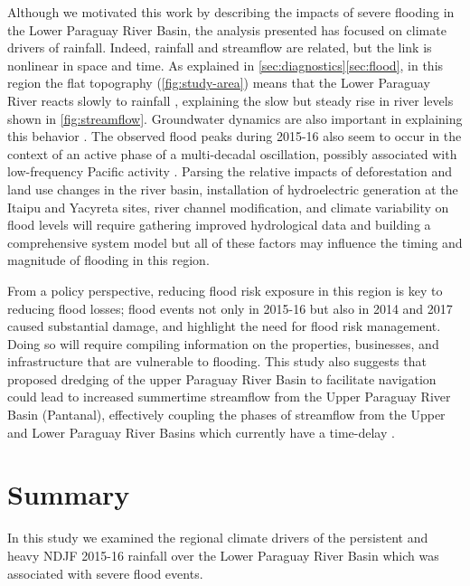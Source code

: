 \documentclass{ametsoc}
\begin{document}
Although we motivated this work by describing the impacts of severe flooding in the Lower Paraguay River Basin, the analysis presented has focused on climate drivers of rainfall.
Indeed, rainfall and streamflow are related, but the link is nonlinear in space and time.
As explained in \cref{sec:diagnostics}\ref{sec:flood}, in this region the flat topography (\cref{fig:study-area}) means that the Lower Paraguay River reacts slowly to rainfall \citep{Bravo:2011et,Barros:2004bn}, explaining the slow but steady rise in river levels shown in \cref{fig:streamflow}.
Groundwater dynamics are also important in explaining this behavior \citep{Santos:2016td}.
The observed flood peaks during 2015-16 also seem to occur in the context of an active phase of a multi-decadal oscillation, possibly associated with low-frequency Pacific activity \citep{Collischonn:2001bi,Huang:2005ir}.
Parsing the relative impacts of deforestation and land use changes in the river basin, installation of hydroelectric generation at the Itaipu and Yacyreta sites, river channel modification, and climate variability on flood levels will require gathering improved hydrological data and building a comprehensive system model but all of these factors may influence the timing and magnitude of flooding in this region.

From a policy perspective, reducing flood risk exposure in this region is key to reducing flood losses; flood events not only in 2015-16 but also in 2014 and 2017 caused substantial damage, and highlight the need for flood risk management.
Doing so will require compiling information on the properties, businesses, and infrastructure that are vulnerable to flooding.
This study also suggests that proposed dredging of the upper Paraguay River Basin to facilitate navigation could lead to increased summertime streamflow from the Upper Paraguay River Basin (Pantanal), effectively coupling the phases of streamflow from the Upper and Lower Paraguay River Basins which currently have a time-delay \citep{Bravo:2011et}.


\section{Summary} \label{sec:summary}

In this study we examined the regional climate drivers of the persistent and heavy NDJF 2015-16 rainfall over the Lower Paraguay River Basin which was associated with severe flood events.
\end{document}
